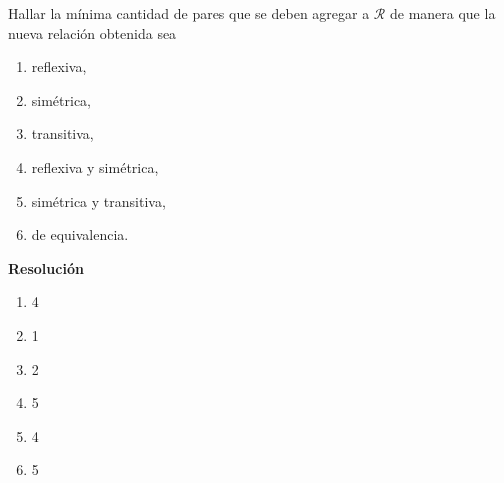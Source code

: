 \documentclass[11pt]{article}
\begin{document}
Hallar la mínima cantidad de pares que se deben agregar a $\mathcal{R}$ de manera que la nueva relación obtenida sea

\begin{enumerate}[label=\roman*)]
    \item reflexiva,
    \item simétrica,
    \item transitiva,
    \item reflexiva y simétrica,
    \item simétrica y transitiva,
    \item de equivalencia.
\end{enumerate}

\textbf{Resolución}

\begin{enumerate}[label=\roman*)]
    \item 4
    \item 1
    \item 2
    \item 5
    \item 4
    \item 5
\end{enumerate}
\end{document}

